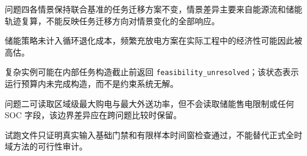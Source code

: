 问题四各情景保持联合基准的任务迁移方案不变，情景差异主要来自能源流和储能轨迹复算，不能反映任务迁移方向对情景变化的全部响应。

储能策略未计入循环退化成本，频繁充放电方案在实际工程中的经济性可能因此被高估。

复杂实例可能在内部任务构造截止前返回 \texttt{feasibility\_unresolved}；该状态表示运行预算内未完成构造，而不是约束系统无解。

问题二可读取区域级最大购电与最大外送功率，但不会读取储能售电限制或任何 SOC 字段，该边界差异应在跨问题比较时保留。

试跑文件只证明真实输入基础门禁和有限样本时间窗检查通过，不能替代正式全时域方法的可行性审计。
